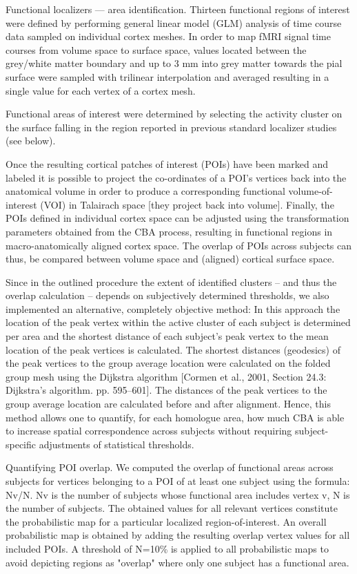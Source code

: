 Functional localizers — area identification.
%
Thirteen functional regions of interest were defined by performing general
linear model (GLM) analysis of time course data sampled on individual cortex
meshes.
%
In order to map fMRI signal time courses from volume space to surface
space, values located between the grey/white matter boundary and up to 3 mm into
grey matter towards the pial surface were sampled with trilinear interpolation
and averaged resulting in a single value for each vertex of a cortex mesh.

Functional areas of interest were determined by selecting the activity cluster
on the surface falling in the region reported in previous standard localizer
studies (see below).

%
Once the resulting cortical patches of interest (POIs) have been marked and
labeled it is possible to project the co-ordinates of a POI's vertices back
into the anatomical volume in order to produce a corresponding functional
volume-of-interest (VOI) in Talairach space [they project back into volume].
%
Finally, the POIs defined in individual cortex space can be adjusted using the
transformation parameters obtained from the CBA process, resulting in functional
regions in macro-anatomically aligned cortex space.
%
The overlap of POIs across subjects can thus, be compared between volume space
and (aligned) cortical surface space.

%
Since in the outlined procedure the extent of identified clusters – and thus the
overlap calculation – depends on subjectively determined thresholds, we also
implemented an alternative, completely objective method:
%
In this approach the location of the peak vertex within the active cluster of
each subject is determined per area and the shortest distance of each subject's
peak vertex to the mean location of the peak vertices is calculated.
%
The shortest distances (geodesics) of the peak vertices to the group average
location were calculated on the folded group mesh using the Dijkstra algorithm
[Cormen et al., 2001, Section 24.3: Dijkstra's algorithm. pp. 595–601].
%
The distances of the peak vertices to the group average location are calculated
before and after alignment.
%
Hence, this method allows one to quantify, for each homologue area, how much CBA
is able to increase spatial correspondence across subjects without requiring
subject-specific adjustments of statistical thresholds.

Quantifying POI overlap.
%
We computed the overlap of functional areas across subjects for vertices
belonging to a POI of at least one subject using the formula: Nv/N.
%
Nv is the number of subjects whose functional area includes vertex v,
%
N is the number of subjects.
%
The obtained values for all relevant vertices constitute the probabilistic map
for a particular localized region-of-interest.
%
An overall probabilistic map is obtained by adding the resulting overlap vertex
values for all included POIs.
%
A threshold of N=10\% is applied to all probabilistic maps to avoid depicting
regions as "overlap" where only one subject has a functional area.

